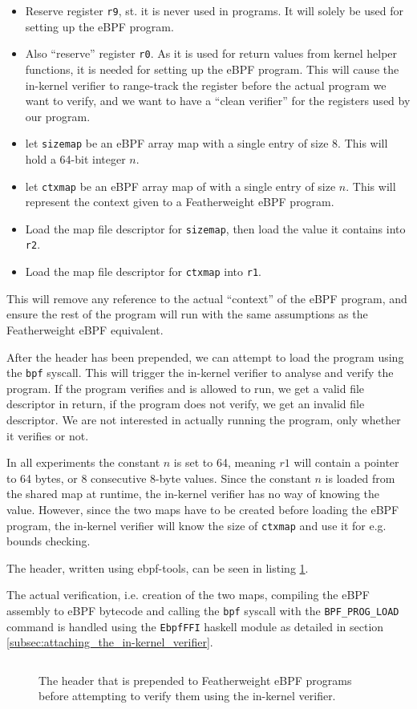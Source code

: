 \begin{itemize}
\item Reserve register \texttt{r9}, st. it is never used in programs. It will solely be used for setting up the eBPF program.
  \item Also ``reserve'' register \texttt{r0}. As it is used for return values from kernel helper functions, it is needed for setting up the eBPF program. This will cause the in-kernel verifier to range-track the register before the actual program we want to verify, and we want to have a ``clean verifier'' for the registers used by our program.
\item let \texttt{sizemap} be an eBPF array map with a single entry of size 8. This will hold a 64-bit integer $n$.
\item let \texttt{ctxmap} be an eBPF array map of with a single entry of size $n$. This will represent the context given to a Featherweight eBPF program.
\item Load the map file descriptor for \texttt{sizemap}, then load the value it contains into \texttt{r2}.
  \item Load the map file descriptor for \texttt{ctxmap} into \texttt{r1}. 
  \end{itemize}
  This will remove any reference to the actual ``context'' of the eBPF program, and ensure the rest of the program will run with the same assumptions as the Featherweight eBPF equivalent.

  
  After the header has been prepended, we can attempt to load the program using the \texttt{bpf} syscall. This will trigger the in-kernel verifier to analyse and verify the program. If the program verifies and is allowed to run, we get a valid file descriptor in return, if the program does not verify, we get an invalid file descriptor.
  We are not interested in actually running the program, only whether it verifies or not.

In all experiments the constant $n$ is set to 64, meaning $r1$ will contain a pointer to 64 bytes, or 8 consecutive 8-byte values. Since the constant $n$ is loaded from the shared map at runtime, the in-kernel verifier has no way of knowing the value. However, since the two maps have to be created before loading the eBPF program, the in-kernel verifier will know the size of \texttt{ctxmap} and use it for e.g. bounds checking. 
  
  The header, written using ebpf-tools, can be seen in listing \ref{snip:compare-header}.

The actual verification, i.e. creation of the two maps, compiling the eBPF assembly to eBPF bytecode and calling the \texttt{bpf} syscall with the \texttt{BPF\_PROG\_LOAD} command is handled using the \texttt{EbpfFFI} haskell module as detailed in section \ref{subsec:attaching_the_in-kernel_verifier}.
  
  \begin{figure}[!htb]
    \centering
\inputminted[linenos]{haskell}{snippets/compare-header.hs}
    \caption{The header that is prepended to Featherweight eBPF programs before attempting to verify them using the in-kernel verifier.}
    \label{snip:compare-header}
  \end{figure}



